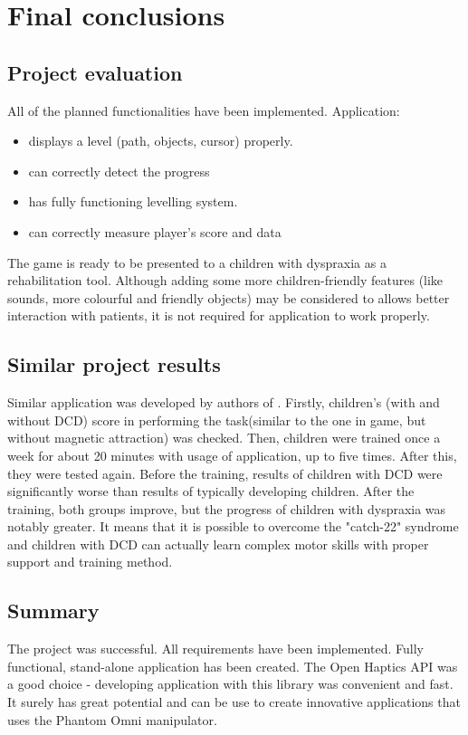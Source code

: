 \chapter{Final conclusions}
\label{conclusions}

\section{Project evaluation}

All of the planned functionalities have been implemented. Application:
\begin{itemize} [noitemsep]
\item displays a level (path, objects, cursor) properly.
\item can correctly detect the progress
\item has fully functioning levelling system.
\item can correctly measure player's score and data
\end{itemize}
The game is ready to be presented to a children with dyspraxia as a rehabilitation tool. Although adding some more children-friendly features (like sounds, more colourful and friendly objects) may be considered to allows better interaction with patients, it is not required for application to work properly.

\section{Similar project results}
Similar application was developed by authors of \cite{13}. Firstly,  children's (with and without DCD) score in performing the task(similar to the one in game, but without magnetic attraction) was checked. Then, children were trained once a week for about 20 minutes with usage of application, up to five times. After this, they were tested again. Before the training, results of children with DCD were significantly worse than results of typically developing children. After the training, both groups improve, but the progress of children with dyspraxia was notably greater. It means that it is possible to overcome the "catch-22" syndrome and children with DCD can actually learn complex motor skills with proper support and training method. 

\section{Summary}
The project was successful. All requirements have been implemented. Fully functional, stand-alone application has been created. The Open Haptics API was a good choice - developing application with this library was convenient and fast. It surely has great potential and can be use to create innovative applications that uses the Phantom Omni manipulator.

